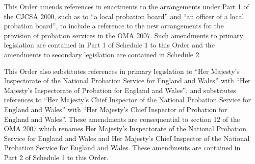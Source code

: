 \documentclass[12pt,a4paper]{article}
\begin{document}
This Order amends references in enactments to the arrangements under Part 1 of the CJCSA 2000, such as to “a local probation board” and “an officer of a local probation board”, to include a reference to the new arrangements for the provision of probation services in the OMA 2007. Such amendments to primary legislation are contained in Part 1 of Schedule 1 to this Order and the amendments to secondary legislation are contained in Schedule 2.

This Order also substitutes references in primary legislation to “Her Majesty’s Inspectorate of the National Probation Service for England and Wales” with “Her Majesty’s Inspectorate of Probation for England and Wales”, and substitutes references to “Her Majesty’s Chief Inspector of the National Probation Service for England and Wales” with “Her Majesty’s Chief Inspector of Probation for England and Wales”. These amendments are consequential to section 12 of the OMA 2007 which renames Her Majesty’s Inspectorate of the National Probation Service for England and Wales and Her Majesty’s Chief Inspector of the National Probation Service for England and Wales. These amendments are contained in Part 2 of Schedule 1 to this Order. 
\end{document}
